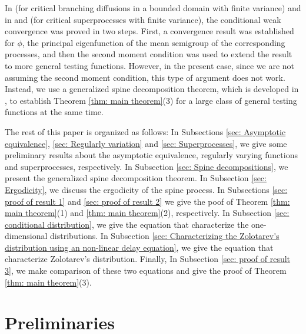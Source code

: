 \documentclass[12pt, a4paper]{amsart}
\theoremstyle{definition}
\numberwithin{equation}{section}
\begin{document}
	In \cite{Powell2015An-invariance} (for critical branching diffusions in a bounded domain with finite variance) and in \cite{RenSongSun2017Spine} and
	\cite{RenSongZhang2015Limit} (for critical superprocesses with finite variance), the conditional weak convergence was proved in two steps.
    First, a convergence result was established for $\phi$, the principal eigenfunction of the mean semigroup of the corresponding processes, and then the second moment condition was used to extend the result to
     more general testing functions.
	However, in the present case, since we are not assuming the second moment condition, this type of argument does not work.
	Instead, we use a generalized spine decomposition theorem, which is developed in \cite{RenSongSun2017Spine}, to establish Theorem \ref{thm: main theorem}(3) for
		a large class of general testing functions at the same time.

	
	The rest of this paper is organized as follows:
    In Subsections
\ref{sec: Asymptotic equivalence}, \ref{sec: Regularly variation} and \ref{sec: Superprocesses}, we give some preliminary results about the asymptotic equivalence, regularly varying functions and superprocesses, respectively.
In Subsection 
\ref{sec: Spine decompositions}, we present the generalized spine decomposition theorem.
In Subsection 
\ref{sec: Ergodicity}, we discuss the ergodicity of the spine process.
    In Subsections
\ref{sec: proof of result 1} and \ref{sec: proof of result 2} we give the poof of Theorem \ref{thm: main theorem}(1) and \ref{thm: main theorem}(2), respectively.
    In Subsection
\ref{sec: conditional distribution}, we give the equation that characterize the one-dimensional distributions.
    In Subsection
\ref{sec: Characterizing the Zolotarev's distribution using an non-linear delay equation}, we give the equation that characterize Zolotarev's distribution.
	Finally, 
    In Subsection
\ref{sec: proof of result 3}, we make comparison of these two equations and give the proof of Theorem \ref{thm: main theorem}(3).

\section{Preliminaries}
\label{sec: Preliminaries}
\end{document}
